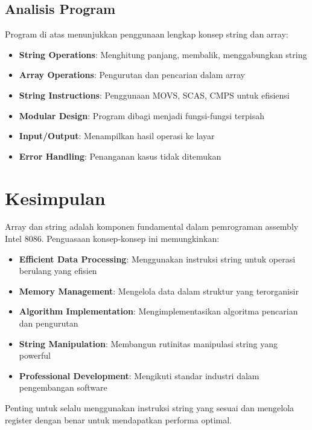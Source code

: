 \documentclass[../main.tex]{subfiles}
\begin{document}
        \subsection{Analisis Program}
            Program di atas menunjukkan penggunaan lengkap konsep string dan array:

            \begin{itemize}
                \item \textbf{String Operations}: Menghitung panjang, membalik, menggabungkan string
                \item \textbf{Array Operations}: Pengurutan dan pencarian dalam array
                \item \textbf{String Instructions}: Penggunaan MOVS, SCAS, CMPS untuk efisiensi
                \item \textbf{Modular Design}: Program dibagi menjadi fungsi-fungsi terpisah
                \item \textbf{Input/Output}: Menampilkan hasil operasi ke layar
                \item \textbf{Error Handling}: Penanganan kasus tidak ditemukan
            \end{itemize}

    \section{Kesimpulan}
        Array dan string adalah komponen fundamental dalam pemrograman assembly Intel 8086. Penguasaan konsep-konsep ini memungkinkan:

        \begin{itemize}
            \item \textbf{Efficient Data Processing}: Menggunakan instruksi string untuk operasi berulang yang efisien
            \item \textbf{Memory Management}: Mengelola data dalam struktur yang terorganisir
            \item \textbf{Algorithm Implementation}: Mengimplementasikan algoritma pencarian dan pengurutan
            \item \textbf{String Manipulation}: Membangun rutinitas manipulasi string yang powerful
            \item \textbf{Professional Development}: Mengikuti standar industri dalam pengembangan software
        \end{itemize}

        Penting untuk selalu menggunakan instruksi string yang sesuai dan mengelola register dengan benar untuk mendapatkan performa optimal.
\end{document}
